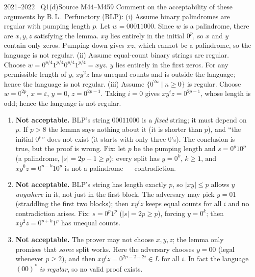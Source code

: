 \documentclass[11pt,a4paper]{article}
\newcommand{\eps}{\varepsilon}
\begin{document}
\begin{question}{2021--2022 \textbullet\ Q1(d)}{Source M44--M45}{9}
Comment on the acceptability of these arguments by B.\,L.\ Perfunctory (BLP):
(i) Assume binary palindromes are regular with pumping length $p$. Let $w=00011000$. Since $w$ is a palindrome, there are $x,y,z$ satisfying the lemma. $xy$ lies entirely in the initial $0^p$, so $x$ and $y$ contain only zeros. Pumping down gives $xz$, which cannot be a palindrome, so the language is not regular.
(ii) Assume equal-count binary strings are regular. Choose $w=0^{p/4}1^{p/4}0^{p/4}1^{p/4}=xyz$. $y$ lies entirely in the first zeros. For any permissible length of $y$, $xy^2z$ has unequal counts and is outside the language; hence the language is not regular.
(iii) Assume $\{0^{2n}\mid n\ge0\}$ is regular. Choose $w=0^{2p}$, $x=\eps$, $y=0$, $z=0^{2p-1}$. Taking $i=0$ gives $xy^iz=0^{2p-1}$, whose length is odd; hence the language is not regular.
\end{question}
\begin{solution}
\begin{enumerate}
\item \textbf{Not acceptable.} BLP's string $00011000$ is a \emph{fixed} string; it must depend on $p$. If $p>8$ the lemma says nothing about it (it is shorter than $p$), and ``the initial $0^p$'' does not exist (it starts with only three 0's). The conclusion is true, but the proof is wrong. Fix: let $p$ be the pumping length and $s=0^p10^p$ (a palindrome, $|s|=2p+1\ge p$); every split has $y=0^k$, $k\ge1$, and $xy^0z=0^{p-k}10^p$ is not a palindrome --- contradiction.
\item \textbf{Not acceptable.} BLP's string has length exactly $p$, so $|xy|\le p$ allows $y$ \emph{anywhere} in it, not just in the first block. The adversary may pick $y=01$ (straddling the first two blocks); then $xy^iz$ keeps equal counts for all $i$ and no contradiction arises. Fix: $s=0^p1^p$ ($|s|=2p\ge p$), forcing $y=0^k$; then $xy^2z=0^{p+k}1^p$ has unequal counts.
\item \textbf{Not acceptable.} The prover may not choose $x,y,z$; the lemma only promises that \emph{some} split works. Here the adversary chooses $y=00$ (legal whenever $p\ge2$), and then $xy^iz=0^{2p-2+2i}\in L$ for all $i$. In fact the language $(00)^*$ \emph{is regular}, so no valid proof exists.
\end{enumerate}
\end{solution}
\end{document}
